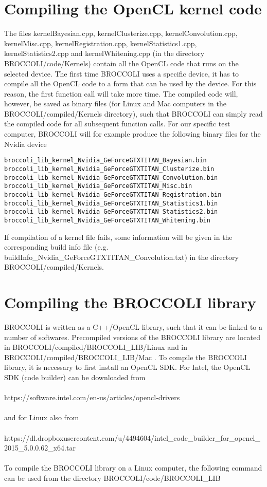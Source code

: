 \section{Compiling the OpenCL kernel code}

The files kernelBayesian.cpp, kernelClusterize.cpp, kernelConvolution.cpp, kernelMisc.cpp, kernelRegistration.cpp, kernelStatistics1.cpp, kernelStatistics2.cpp and kernelWhitening.cpp (in the directory BROCCOLI/code/Kernels) contain all the OpenCL code that runs on the selected device. The first time BROCCOLI uses a specific device, it has to compile all the OpenCL code to a form that can be used by the device. For this reason, the first function call will take more time. The compiled code will, however, be saved as binary files (for Linux and Mac computers in the BROCCOLI/compiled/Kernels directory), such that BROCCOLI can simply read the compiled code for all subsequent function calls. For our specific test computer, BROCCOLI will for example produce the following binary files for the Nvidia device

\begin{verbatim}
broccoli_lib_kernel_Nvidia_GeForceGTXTITAN_Bayesian.bin
broccoli_lib_kernel_Nvidia_GeForceGTXTITAN_Clusterize.bin 
broccoli_lib_kernel_Nvidia_GeForceGTXTITAN_Convolution.bin
broccoli_lib_kernel_Nvidia_GeForceGTXTITAN_Misc.bin 
broccoli_lib_kernel_Nvidia_GeForceGTXTITAN_Registration.bin
broccoli_lib_kernel_Nvidia_GeForceGTXTITAN_Statistics1.bin
broccoli_lib_kernel_Nvidia_GeForceGTXTITAN_Statistics2.bin
broccoli_lib_kernel_Nvidia_GeForceGTXTITAN_Whitening.bin
\end{verbatim}
If compilation of a kernel file fails, some information will be given in the corresponding build info file (e.g. buildInfo\_Nvidia\_GeForceGTXTITAN\_Convolution.txt) in the directory BROCCOLI/compiled/Kernels. 

\section{Compiling the BROCCOLI library}

BROCCOLI is written as a C++/OpenCL library, such that it can be linked to a number of softwares. Precompiled versions of the BROCCOLI library are located in BROCCOLI/compiled/BROCCOLI\_LIB/Linux and in BROCCOLI/compiled/BROCCOLI\_LIB/Mac . To compile the BROCCOLI library, it is necessary to first install an OpenCL SDK. For Intel, the OpenCL SDK (code builder) can be downloaded from \\ \\ https://software.intel.com/en-us/articles/opencl-drivers \\ \\ and for Linux also from \\ \\ https://dl.dropboxusercontent.com/u/4494604/intel\_code\_builder\_for\_opencl\_2015\_5.0.0.62\_x64.tar \\ \\ To compile the BROCCOLI library on a Linux computer, the following command can be used from the directory BROCCOLI/code/BROCCOLI\_LIB 

